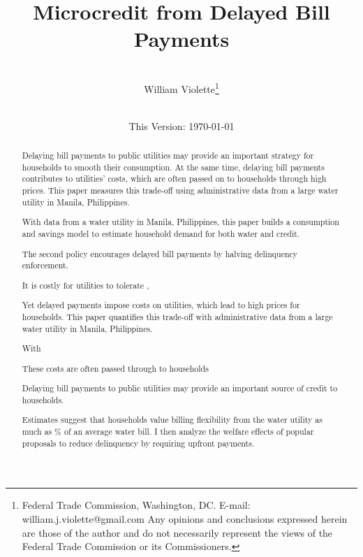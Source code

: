 \documentclass[12pt,table]{article}
\begin{document}
\begin{titlepage} 
\title{{Microcredit from Delayed Bill Payments}}
\author{\\[3em]
  William Violette\thanks{Federal Trade Commission, Washington, DC. E-mail: william.j.violette@gmail.com   Any opinions and conclusions expressed herein are those of the author and do not necessarily represent the views of the Federal Trade Commission or its Commissioners.} \\
 \\ 
  }
\vspace{30mm}
\date{\vspace{5mm}This Version: \today}
\maketitle
\begin{abstract}

Delaying bill payments to public utilities may provide an important strategy for households to smooth their consumption.  At the same time, delaying bill payments contributes to utilities' costs, which are often passed on to households through high prices.  This paper measures this trade-off using administrative data from a large water utility in Manila, Philippines.

With data from a water utility in Manila, Philippines, this paper builds a consumption and savings model to estimate household demand for both water and credit.  


The second policy encourages delayed bill payments by halving delinquency enforcement.


It is costly for utilities to tolerate , 

Yet delayed payments impose costs on utilities, which lead to high prices for households.  This paper quantifies this trade-off  with administrative data from a large water utility in Manila, Philippines.




With 




These costs are often passed through to households 


Delaying bill payments to public utilities may provide an important source of credit to households.  

Estimates suggest that households value billing flexibility  from the water utility as much as \unskip\% of an average water bill.  I then analyze the welfare effects of popular proposals to reduce delinquency by requiring upfront payments.  



\end{abstract}
\end{titlepage}
\end{document}
